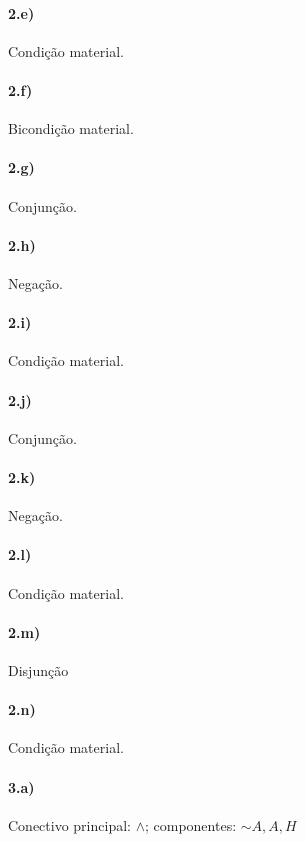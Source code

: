 \documentclass[pdftex,a4paper,12pt,brazil]{article} %
\begin{document}
\paragraph{2.e)} Condição material.

\paragraph{2.f)} Bicondição material.

\paragraph{2.g)} Conjunção.

\paragraph{2.h)} Negação.

\paragraph{2.i)} Condição material.

\paragraph{2.j)} Conjunção.

\paragraph{2.k)} Negação.

\paragraph{2.l)} Condição material.

\paragraph{2.m)} Disjunção

\paragraph{2.n)} Condição material.

\paragraph{3.a)} Conectivo principal: $\wedge$; componentes: $\sim A, A, H$
\end{document}
